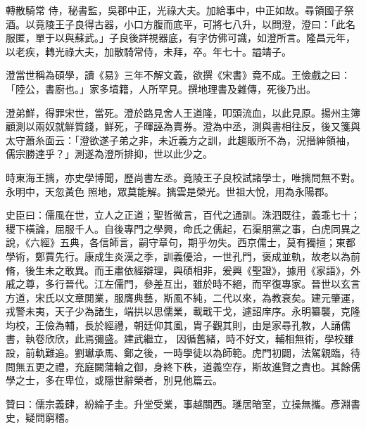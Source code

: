 \begin{pinyinscope}
 轉散騎常
 侍，秘書監，吳郡中正，光祿大夫。加給事中，中正如故。尋領國子祭酒。以竟陵王子良得古器，小口方腹而底平，可將七八升，以問澄，澄曰：「此名服匿，單于以與蘇武。」子良後詳視器底，有字仿佛可識，如澄所言。隆昌元年，以老疾，轉光祿大夫，加散騎常侍，未拜，卒。年七十。謚靖子。



 澄當世稱為碩學，讀《易》三年不解文義，欲撰《宋書》竟不成。王儉戲之曰：「陸公，書廚也。」家多墳籍，人所罕見。撰地理書及雜傳，死後乃出。



 澄弟鮮，得罪宋世，當死。澄於路見舍人王道隆，叩頭流血，以此見原。揚州主簿顧測以兩奴就鮮質錢，鮮死，子暉誣為賣券。澄為中丞，測與書相往反，後又箋與太守蕭糸面云：「澄欲遂子弟之非，未近義方之訓，此趨販所不為，況搢紳領袖，儒宗勝達乎？」測遂為澄所排抑，世以此少之。



 時東海王摛，亦史學博聞，歷尚書左丞。竟陵王子良校試諸學士，唯摛問無不對。永明中，天忽黃色
 照地，眾莫能解。摛雲是榮光。世祖大悅，用為永陽郡。



 史臣曰：儒風在世，立人之正道；聖哲微言，百代之通訓。洙泗既往，義乖七十；稷下橫論，屈服千人。自後專門之學興，命氏之儒起，石渠朋黨之事，白虎同異之說，《六經》五典，各信師言，嗣守章句，期乎勿失。西京儒士，莫有獨擅；東都學術，鄭賈先行。康成生炎漢之季，訓義優洽，一世孔門，褒成並軌，故老以為前脩，後生未之敢異。而王肅依經辯理，與碩相非，爰興《聖證》，據用《家語》，外戚之尊，多行晉代。江左儒門，參差互出，雖於時不絕，而罕復專家。晉世以玄言方道，宋氏以文章閒業，服膺典藝，斯風不純，二代以來，為教衰矣。建元肇運，戎警未夷，天子少為諸生，端拱以思儒業，載戢干戈，遽詔庠序。永明纂襲，克隆均校，王儉為輔，長於經禮，朝廷仰其風，胄子觀其則，由是家尋孔教，人誦儒書，執卷欣欣，此焉彌盛。建武繼立，
 因循舊緒，時不好文，輔相無術，學校雖設，前軌難追。劉瓛承馬、鄭之後，一時學徒以為師範。虎門初闢，法駕親臨，待問無五更之禮，充庭闕蒲輪之御，身終下秩，道義空存，斯故進賢之責也。其餘儒學之士，多在卑位，或隱世辭榮者，別見他篇云。



 贊曰：儒宗義肆，紛綸子圭。升堂受業，事越關西。璡居暗室，立操無攜。彥淵書史，疑問窮稽。



\end{pinyinscope}